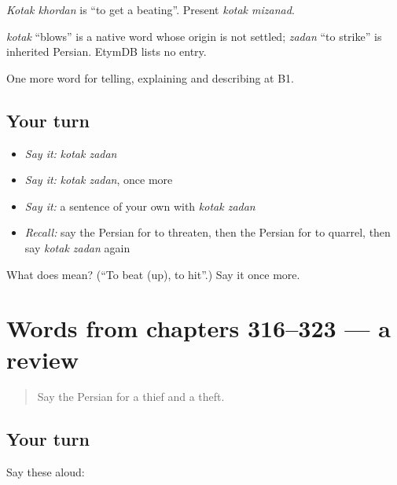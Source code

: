 \emph{Kotak khordan} is \textquotedblleft{}to get a beating\textquotedblright{}. Present \emph{kotak mizanad}.

\begin{cousinweb}
\emph{kotak} \textquotedblleft{}blows\textquotedblright{} is a native word whose origin is not settled; \emph{zadan} \textquotedblleft{}to strike\textquotedblright{} is inherited Persian. EtymDB lists no entry.
\end{cousinweb}

\begin{grammarlens}[title={What you've built}]
One more word for telling, explaining and describing at B1.
\end{grammarlens}

\subsection*{Your turn}
\begin{itemize}
\raggedright
  \item \emph{Say it:} \emph{kotak zadan}
  \item \emph{Say it:} \emph{kotak zadan}, once more
  \item \emph{Say it:} a sentence of your own with \emph{kotak zadan}
  \item \emph{Recall:} say the Persian for to threaten, then the Persian for to quarrel, then say \emph{kotak zadan} again
\end{itemize}

\begin{tcolorbox}[breakable,colback=teal!4,colframe=teal!35!black,title={Before you move on}]
What does   mean? (\textquotedblleft{}To beat (up), to hit\textquotedblright{}.) Say it once more.
\end{tcolorbox}
\section[(dialogue)]{Words from chapters 316–323 — a review}

\label{lesson:FA-R323-review-316-323}



\begin{quote}
Say the Persian for a thief and a theft.
\end{quote}

\subsection*{Your turn}
Say these aloud:

